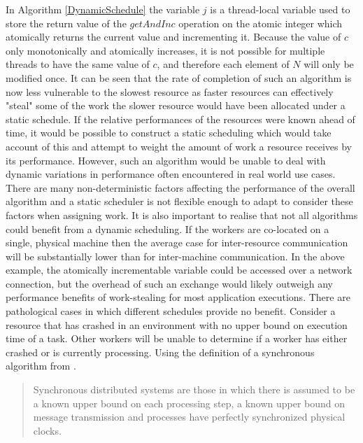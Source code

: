 \documentclass[12pt]{article}
\begin{document}
In Algorithm \ref{DynamicSchedule} the variable $j$ is a thread-local variable used to store the return value of the $getAndInc$ operation on the atomic integer which atomically returns the current value and incrementing it. Because the value of $c$ only monotonically and atomically increases, it is not possible for multiple threads to have the same value of $c$, and therefore each element of $N$ will only be modified once. It can be seen that the rate of completion of such an algorithm is now less vulnerable to the slowest resource as faster resources can effectively "steal" some of the work the slower resource would have been allocated under a static schedule.
\newline
If the relative performances of the resources were known ahead of time, it would be possible to construct a static scheduling which would take account of this and attempt to weight the amount of work a resource receives by its performance. However, such an algorithm would be unable to deal with dynamic variations in performance often encountered in real world use cases. There are many non-deterministic factors affecting the performance of the overall algorithm and a static scheduler is not flexible enough to adapt to consider these factors when assigning work.
\newline
It is also important to realise that not all algorithms could benefit from a dynamic scheduling. If the workers are co-located on a single, physical machine then the average case for inter-resource communication will be substantially lower than for inter-machine communication. In the above example, the atomically incrementable variable could be accessed over a network connection, but the overhead of such an exchange would likely outweigh any performance benefits of work-stealing for most application executions.
\newline
There are pathological cases in which different schedules provide no benefit. Consider a resource that has crashed in an environment with no upper bound on execution time of a task. Other workers will be unable to determine if a worker has either crashed or is currently processing.
\newline
Using the definition of a synchronous algorithm from \cite{mageeanalyzing}.

\blockquote{Synchronous distributed systems are those in which there is assumed
to be a known upper bound on each processing step, a known upper bound on
message transmission and processes have perfectly synchronized physical
clocks.}
\end{document}
